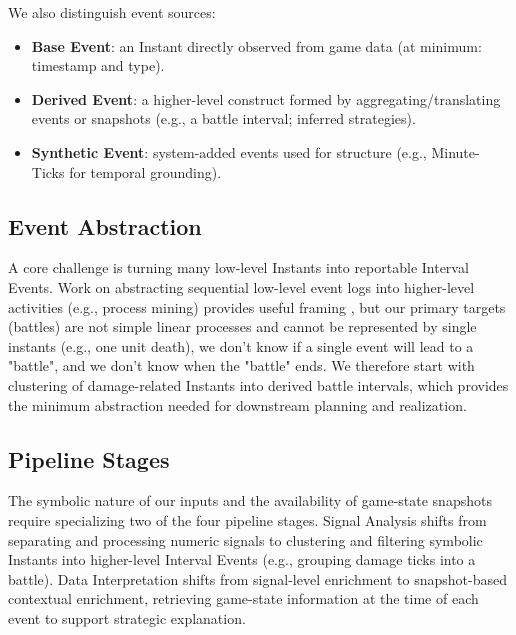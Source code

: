 We also distinguish event sources:
\begin{itemize}
  \item \textbf{Base Event}: an Instant directly observed from game data (at minimum: timestamp and type).
  \item \textbf{Derived Event}: a higher-level construct formed by aggregating/translating events or snapshots (e.g., a battle interval; inferred strategies).
  \item \textbf{Synthetic Event}: system-added events used for structure (e.g., Minute-Ticks for temporal grounding).
\end{itemize}

\subsection{Event Abstraction}
A core challenge is turning many low-level Instants into reportable Interval Events. Work on abstracting sequential low-level event logs into higher-level activities (e.g., process mining) provides useful framing \cite{zelst2021}, but our primary targets (battles) are not simple linear processes and cannot be represented by single instants (e.g., one unit death), we don't know if a single event will lead to a "battle", and we don't know when the "battle" ends. We therefore start with clustering of damage-related Instants into derived battle intervals, which provides the minimum abstraction needed for downstream planning and realization.

\subsection{Pipeline Stages}
The symbolic nature of our inputs and the availability of game-state snapshots require specializing two of the four pipeline stages. Signal Analysis shifts from separating and processing numeric signals to clustering and filtering symbolic Instants into higher-level Interval Events (e.g., grouping damage ticks into a battle). Data Interpretation shifts from signal-level enrichment to snapshot-based contextual enrichment, retrieving game-state information at the time of each event to support strategic explanation.

